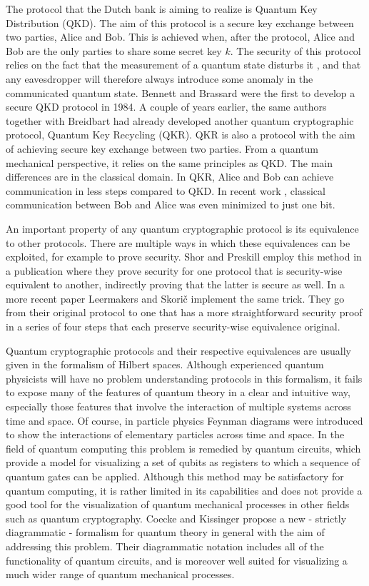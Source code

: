 \documentclass[]{article}
\begin{document}
The protocol that the Dutch bank is aiming to realize is Quantum Key Distribution (QKD). The aim of this protocol is a secure key exchange between two parties, Alice and Bob. This is achieved when, after the protocol, Alice and Bob are the only parties to share some secret key $k$. The security of this protocol relies on the fact that the measurement of a quantum state disturbs it \cite{Lindblad1999}, and that any eavesdropper will therefore always introduce some anomaly in the communicated quantum state. Bennett and Brassard were the first to develop a secure QKD protocol in 1984. A couple of years earlier, the same authors together with Breidbart had already developed another quantum cryptographic protocol, Quantum Key Recycling (QKR). QKR is also a protocol with the aim of achieving secure key exchange between two parties. From a quantum mechanical perspective, it relies on the same principles as QKD. The main differences are in the classical domain. In QKR, Alice and Bob can achieve communication in less steps compared to QKD. In recent work \cite{Leermakers2019}, classical communication between Bob and Alice was even minimized to just one bit. 

An important property of any quantum cryptographic protocol is its equivalence to other protocols. There are multiple ways in which these equivalences can be exploited, for example to prove security. Shor and Preskill employ this method in a publication \cite{Shor2000} where they prove security for one protocol that is security-wise equivalent to another, indirectly proving that the latter is secure as well. In a more recent paper \cite{Leermakers2019} Leermakers and Skori\v{c} implement the same trick. They go from their original protocol to one that has a more straightforward security proof in a series of four steps that each preserve security-wise equivalence original. 

Quantum cryptographic protocols and their respective equivalences are usually given in the formalism of Hilbert spaces. Although experienced quantum physicists will have no problem understanding protocols in this formalism, it fails to expose many of the features of quantum theory in a clear and intuitive way, especially those features that involve the interaction of multiple systems across time and space. Of course, in particle physics Feynman diagrams were introduced to show the interactions of elementary particles across time and space. In the field of quantum computing this problem is remedied by quantum circuits, which provide a model for visualizing a set of qubits as registers to which a sequence of quantum gates can be applied. Although this method may be satisfactory for quantum computing, it is rather limited in its capabilities and does not provide a good tool for the visualization of quantum mechanical processes in other fields such as quantum cryptography. Coecke and Kissinger \cite{Coecke2017} propose a new - strictly diagrammatic - formalism for quantum theory in general with the aim of addressing this problem. Their diagrammatic notation includes all of the functionality of quantum circuits, and is moreover well suited for visualizing a much wider range of quantum mechanical processes.
\end{document}

